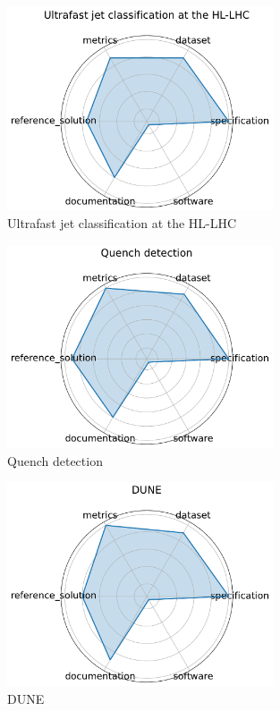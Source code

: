 \documentclass{article}
\begin{document}
\begin{figure}[h!]
  \centering
  \includegraphics[width=0.7\textwidth]{Ultrafast jet classification at the HL-LHC_radar.pdf}
  \caption{Ultrafast jet classification at the HL-LHC \cite{odiagiu2024}}
\end{figure}

\begin{figure}[h!]
  \centering
  \includegraphics[width=0.7\textwidth]{Quench detection_radar.pdf}
  \caption{Quench detection}
\end{figure}

\begin{figure}[h!]
  \centering
  \includegraphics[width=0.7\textwidth]{DUNE_radar.pdf}
  \caption{DUNE}
\end{figure}
\end{document}
